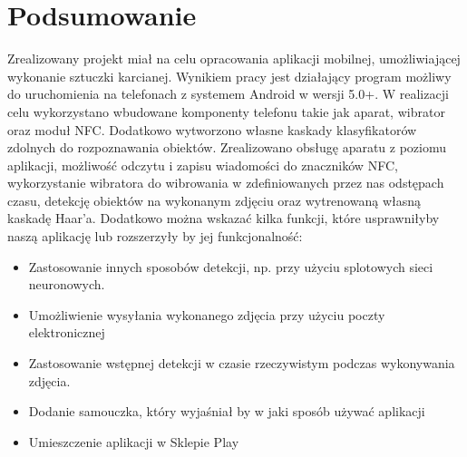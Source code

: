 \documentclass{article}
\let\stdsection\section
\renewcommand\section{\newpage\stdsection}
\numberwithin{equation}{section}
\begin{document}
\section{Podsumowanie}
Zrealizowany projekt miał na celu opracowania aplikacji mobilnej, umożliwiającej wykonanie sztuczki karcianej. Wynikiem pracy jest działający program możliwy do uruchomienia na telefonach z systemem Android w wersji 5.0+. W realizacji celu wykorzystano wbudowane komponenty telefonu takie jak aparat, wibrator oraz moduł NFC. Dodatkowo wytworzono własne kaskady klasyfikatorów zdolnych do rozpoznawania obiektów. Zrealizowano obsługę aparatu z poziomu aplikacji, możliwość odczytu i zapisu wiadomości do znaczników NFC, wykorzystanie wibratora do wibrowania w zdefiniowanych przez nas odstępach czasu, detekcję obiektów na wykonanym zdjęciu oraz wytrenowaną własną kaskadę Haar'a.
Dodatkowo można wskazać kilka funkcji, które usprawniłyby naszą aplikację lub rozszerzyły by jej funkcjonalność:
\begin{itemize}
    \item Zastosowanie innych sposobów detekcji, np. przy użyciu splotowych sieci neuronowych.
    \item Umożliwienie wysyłania wykonanego zdjęcia przy użyciu poczty elektronicznej
    \item Zastosowanie wstępnej detekcji w czasie rzeczywistym podczas wykonywania zdjęcia.
    \item Dodanie samouczka, który wyjaśniał by w jaki sposób używać aplikacji
    \item Umieszczenie aplikacji w Sklepie Play
\end{itemize}





\end{document}
